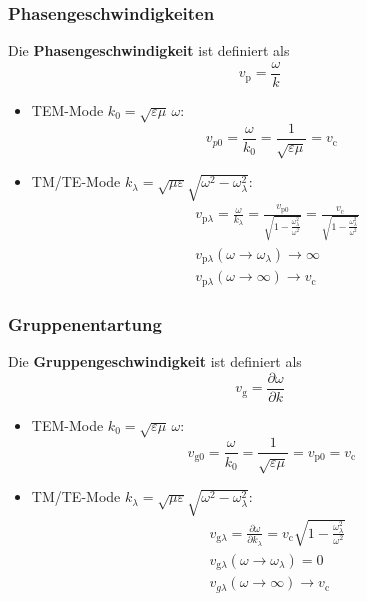 \subsubsection{Phasengeschwindigkeiten} 
Die \textbf{Phasengeschwindigkeit} ist definiert als 
\begin{equation}
	v_\mathrm{p} = \frac{\omega}{ k}
\end{equation} 
	\begin{itemize}
		\item TEM-Mode \( k_0=\sqrt{\varepsilon\mu}\, \omega\):
		\begin{equation}
			v_{p0} = \frac{\omega}{ k_0} = \frac{1}{\sqrt{\varepsilon\mu}} =  v_\mathrm{c}
		\end{equation}
		\item TM/TE-Mode \( k_\lambda=\sqrt{\mu\varepsilon}\sqrt{\omega^2-\omega_\lambda^2}\):
		\begin{equation}\begin{split}
			&v_{\mathrm{p}\lambda} = \frac{\omega}{ k_\lambda} = \frac{ v_{\mathrm{p}0}}{\sqrt{1-\frac{\omega_\lambda^2}{\omega^2}}} = \frac{ v_\mathrm{c}}{\sqrt{1-\frac{\omega_\lambda^2}{\omega^2}}}\\  &v_{\mathrm{p}\lambda}(\omega\to\omega_\lambda)\to\infty \\  &v_{\mathrm{p}\lambda}(\omega\to\infty)\to v_\mathrm{c}
		\end{split}\end{equation}
	\end{itemize}
	\subsubsection{Gruppenentartung}
	Die \textbf{Gruppengeschwindigkeit} ist definiert als 
	\begin{equation}
		v_\mathrm{g} = \frac{\partial \omega}{\partial  k}
	\end{equation} 
	\begin{itemize}
		\item TEM-Mode \( k_0=\sqrt{\varepsilon\mu}\, \omega\):
		\begin{equation}
			v_\mathrm{g0} = \frac{\omega}{ k_0} = \frac{1}{\sqrt{\varepsilon\mu}} =  v_\mathrm{p0}= v_\mathrm{c}
		\end{equation}
		\item TM/TE-Mode \( k_\lambda=\sqrt{\mu\varepsilon}\sqrt{\omega^2-\omega_\lambda^2}\):
		\begin{equation}\begin{split}
			&v_{\mathrm{g}\lambda} = \frac{\partial \omega}{\partial  k_\lambda} =  v_\mathrm{c} \sqrt{1-\frac{\omega_\lambda^2}{\omega^2}} \\  &v_{\mathrm{g}\lambda}(\omega\to\omega_\lambda)=0 \\  &v_{g\lambda}(\omega\to\infty)\to v_\mathrm{c}
		\end{split}\end{equation}	
	\end{itemize}

